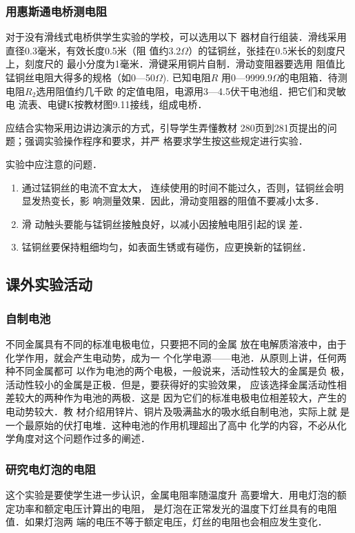 \subsubsection{用惠斯通电桥测电阻}
对于没有滑线式电桥供学生实验的学校，可以选用以下
器材自行组装．滑线采用直径0.3毫米，有效长度0.5米（阻
值约3.2$\Omega$）的锰铜丝，张挂在0.5米长的刻度尺上，刻度尺的
最小分度为1毫米．滑键采用铜片自制．滑动变阻器要选用
阻值比锰铜丝电阻大得多的规格（如0—50$\Omega$). 已知电阻$R$
用0—9999.9$\Omega$的电阻箱．待测电阻$R_2$选用阻值约几千欧
的定值电阻，电源用3—4.5伏干电池组．把它们和灵敏电
流表、电键K按教材图9.11接线，组成电桥．

应结合实物采用边讲边演示的方式，引导学生弄懂教材
280页到281页提出的问题；强调实验操作程序和要求，并严
格要求学生按这些规定进行实验．

实验中应注意的问题．
\begin{enumerate}
\item 通过锰铜丝的电流不宜太大，
连续使用的时间不能过久，否则，锰铜丝会明显发热变长，影
响测量效果．因此，滑动变阻器的阻值不要减小太多．    
\item 滑
动触头要能与锰铜丝接触良好，以减小因接触电阻引起的误
差．    
\item 锰铜丝要保持粗细均匀，如表面生锈或有碰伤，应更换新的锰铜丝．
\end{enumerate}

\subsection{课外实验活动}
\subsubsection{自制电池}
不同金属具有不同的标准电极电位，只要把不同的金属
放在电解质溶液中，由于化学作用，就会产生电动势，成为一
个化学电源——电池．从原则上讲，任何两种不同金属都可
以作为电池的两个电极，一般说来，活动性较大的金属是负
极，活动性较小的金属是正极．但是，要获得好的实验效果，
应该选择金属活动性相差较大的两种作为电池的两极．这是
因为它们的标准电极电位相差较大，产生的电动势较大．教
材介绍用锌片、铜片及吸满盐水的吸水纸自制电池，实际上就
是一个最原始的伏打电堆．这种电池的作用机理超出了高中
化学的内容，不必从化学角度对这个问题作过多的阐述．

\subsubsection{研究电灯泡的电阻}

这个实验是要使学生进一步认识，金属电阻率随温度升
高要增大．用电灯泡的额定功率和额定电压计算出的电阻，
是灯泡在正常发光的温度下灯丝具有的电阻值．如果灯泡两
端的电压不等于额定电压，灯丝的电阻也会相应发生变化．


